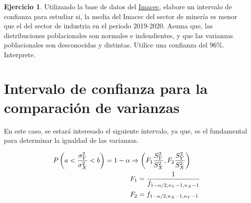 \documentclass[
  11pt,
]{book}
\theoremstyle{definition}
\theoremstyle{definition}
\theoremstyle{definition}
\newtheorem{exercise}{Ejercicio}[chapter]
\theoremstyle{definition}
\theoremstyle{remark}
\begin{document}
\begin{exercise}
Utilizando la base de datos del \hyperref[Imacec1]{Imacec}, elabore un intervalo de confianza para estudiar si, la media del Imacec del sector de minería es menor que el del sector de industria en el periodo 2019-2020. Asuma que, las distribuciones poblacionales son normales e indendientes, y que las varianzas poblacionales son desconocidas y distintas. Utilice una confianza del 96\%. Interprete.
\end{exercise}

\section{Intervalo de confianza para la comparación de varianzas}\label{intervalo-de-confianza-para-la-comparaciuxf3n-de-varianzas}

En este caso, se estará interesado el siguiente intervalo, ya que, es el fundamental para determinar la igualdad de las varianzas.

\begin{equation}
\notag
\begin{split}
P\left(a<\frac{\sigma_Y^2}{\sigma_X^2}<b\right) = 1-\alpha &\Rightarrow \left( F_1\frac{S_Y^2}{S_X^2},F_2\frac{S_Y^2}{S_X^2} \right)\\
& F_1 = \frac{1}{f_{1-\alpha/2,n_Y-1,n_X-1}}\\
& F_2 = f_{1-\alpha/2,n_X-1,n_Y-1}
\end{split}
\end{equation}
\end{document}
